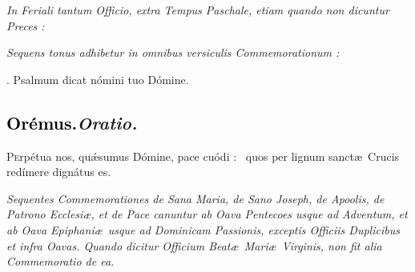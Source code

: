 \documentclass[12pt]{article} %
\def\noinitial{%
\gresetfirstlineaboveinitial{\textcolor{benred8}{\small \textsc{\textbf{}}}}{\textcolor{benred8}{\small \textsc{\textbf{}}}}
\setspaceafterinitial{0pt plus 0em minus 0em}%
\setspacebeforeinitial{0pt plus 0em minus 0em}%
\relax %
}
\newenvironment{rubric}{\vspace{1 mm}\color{benred8} \itshape \leftskip 0in \setlength{\parindent}{0.25in}}{\vspace{1 mm}}
\newenvironment{response}{\leftskip 0in \setlength{\parindent}{0in}}{\vspace{1 mm}}
\let\oldgresixstar\gresixstar
\renewcommand{\gresixstar}{\textcolor{benred8}{\oldgresixstar}}
\let\oldRbar\Rbar
\renewcommand{\Rbar}{\textcolor{benred8}{\oldRbar .}}
\def\capitulumSpace{\hspace{20 mm}}
\begin{document}
\begin{rubric}
In Feriali tantum Officio, extra Tempus Paschale, etiam quando non dicuntur Preces :

\end{rubric}


\gresetfirstlineaboveinitial{\small \textsc{ \textbf{\textcolor{benred8}{II}}}}{\small \textsc{ \textbf{\textcolor{benred8}{II}}}}

\begin{rubric}
Sequens tonus adhibetur in omnibus versiculis Commemorationum :

\end{rubric}

{\noinitial
{}

}

\begin{response}
\hspace{1.0 mm}\Rbar\hspace{0.3mm} Psalmum \hspace{3.4mm} dicat \hspace{3.4mm} n\'{o}mini \hspace{3.9mm} tuo \hspace{3.4mm} D\'{o}mine.

\end{response}

\subsection*{\textcolor{black}{Or\'{e}mus.}\capitulumSpace \emph{Oratio.}}

\begin{response}\lettrine[nindent=-1.5mm]{P}{e}rp\'{e}tua nos, qu\'{\ae}sumus D\'{o}mine, pace cu\'{o}di : \gresixstar\ quos per lignum sanct\ae\ Crucis red\'{i}mere dign\'{a}tus es.

\end{response}

\begin{rubric}
Sequentes Commemorationes de Sana Maria, de Sano Joseph, de Apoolis, de Patrono Ecclesi\ae , et de Pace canuntur ab Oava Pentecoes usque ad Adventum, et ab Oava Epiphani\ae\ usque ad Dominicam Passionis, exceptis Officiis Duplicibus et infra Oavas. Quando dicitur Officium Beat\ae\ Mari\ae\ Virginis, non fit alia Commemoratio de ea.

\end{rubric}
\end{document}
